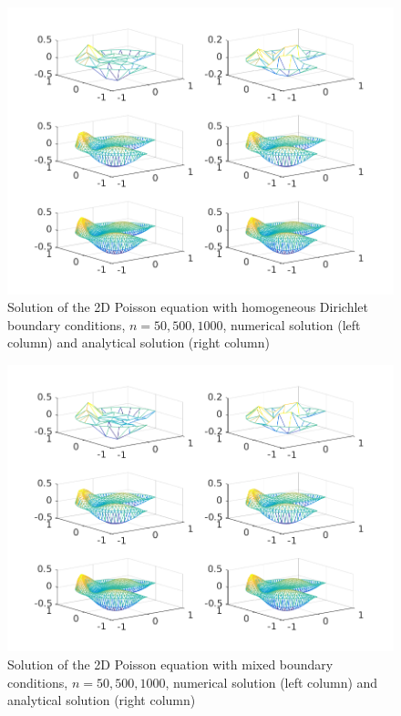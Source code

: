 \documentclass{report}
\begin{document}
\begin{figure}
	\includegraphics[width=\textwidth]{../out/test_poisson2d_dirichlet.png}
	\caption{Solution of the 2D Poisson equation with homogeneous Dirichlet boundary conditions, $n=50, 500, 1000$, numerical solution (left column) and analytical solution (right column)}
	\label{vis:2dpoissondir}
\end{figure}

\begin{figure}
	\includegraphics[width=\textwidth]{../out/test_poisson2d_neumann.png}
	\caption{Solution of the 2D Poisson equation with mixed boundary conditions, $n=50, 500, 1000$, numerical solution (left column) and analytical solution (right column)}
	\label{vis:2dpoissonneu}
\end{figure}
\end{document}
